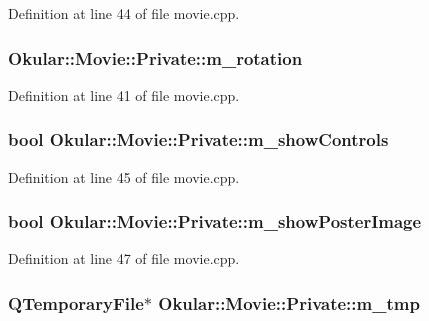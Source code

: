 Definition at line 44 of file movie.\+cpp.

\hypertarget{classMovie_1_1Private_ac853dc27239be18e7e6fc0ce975168dc}{
\subsubsection[{m\+\_\+rotation}]{ Okular\+::\+Movie\+::\+Private\+::m\+\_\+rotation}}\label{classMovie_1_1Private_ac853dc27239be18e7e6fc0ce975168dc}


Definition at line 41 of file movie.\+cpp.

\hypertarget{classMovie_1_1Private_ad5410d6b4a6ad3b9c894cfc1dce9b1d0}{
\subsubsection[{m\+\_\+show\+Controls}]{\setlength{\rightskip}{0pt plus 5cm}bool Okular\+::\+Movie\+::\+Private\+::m\+\_\+show\+Controls}}\label{classMovie_1_1Private_ad5410d6b4a6ad3b9c894cfc1dce9b1d0}


Definition at line 45 of file movie.\+cpp.

\hypertarget{classMovie_1_1Private_a914c169b8e31855cc2cf444a5475d384}{
\subsubsection[{m\+\_\+show\+Poster\+Image}]{\setlength{\rightskip}{0pt plus 5cm}bool Okular\+::\+Movie\+::\+Private\+::m\+\_\+show\+Poster\+Image}}\label{classMovie_1_1Private_a914c169b8e31855cc2cf444a5475d384}


Definition at line 47 of file movie.\+cpp.

\hypertarget{classMovie_1_1Private_a7cb9fd2bb37d4e64e46512cda29fbf73}{
\subsubsection[{m\+\_\+tmp}]{\setlength{\rightskip}{0pt plus 5cm}Q\+Temporary\+File$\ast$ Okular\+::\+Movie\+::\+Private\+::m\+\_\+tmp}}\label{classMovie_1_1Private_a7cb9fd2bb37d4e64e46512cda29fbf73}


